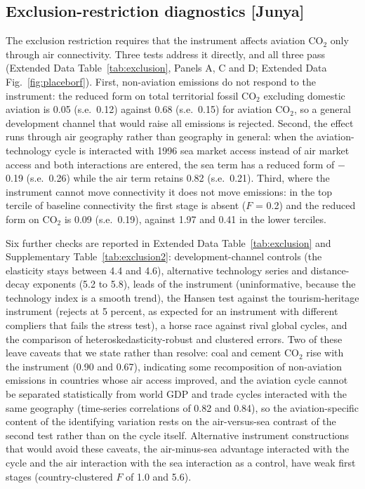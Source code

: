 \documentclass[12pt]{extarticle}
\begin{document}
\subsection*{Exclusion-restriction diagnostics [Junya]}
The exclusion restriction requires that the instrument affects aviation
CO$_2$ only through air connectivity. Three tests address it directly, and
all three pass (Extended Data Table~\ref{tab:exclusion}, Panels A, C and D;
Extended Data Fig.~\ref{fig:placeborf}). First, non-aviation emissions do
not respond to the instrument: the reduced form on total territorial fossil
CO$_2$ excluding domestic aviation is 0.05 (s.e.\ 0.12) against 0.68 (s.e.\
0.15) for aviation CO$_2$, so a general development channel that would
raise all emissions is rejected. Second, the effect runs through air
geography rather than geography in general: when the aviation-technology
cycle is interacted with 1996 sea market access instead of air market
access and both interactions are entered, the sea term has a reduced form
of $-$0.19 (s.e.\ 0.26) while the air term retains 0.82 (s.e.\ 0.21). Third,
where the instrument cannot move connectivity it does not move emissions:
in the top tercile of baseline connectivity the first stage is absent
($F$ = 0.2) and the reduced form on CO$_2$ is 0.09 (s.e.\ 0.19), against
1.97 and 0.41 in the lower terciles.

Six further checks are reported in Extended Data Table~\ref{tab:exclusion}
and Supplementary Table~\ref{tab:exclusion2}: development-channel controls
(the elasticity stays between 4.4 and 4.6), alternative technology series
and distance-decay exponents (5.2 to 5.8), leads of the instrument
(uninformative, because the technology index is a smooth trend), the
Hansen test against the tourism-heritage instrument (rejects at 5 percent,
as expected for an instrument with different compliers that fails the
stress test), a horse race against rival global cycles, and the comparison
of heteroskedasticity-robust and clustered errors. Two of these leave
caveats that we state rather than resolve: coal and cement CO$_2$ rise
with the instrument (0.90 and 0.67), indicating some recomposition of
non-aviation emissions in countries whose air access improved, and the
aviation cycle cannot be separated statistically from world GDP and trade
cycles interacted with the same geography (time-series correlations of
0.82 and 0.84), so the aviation-specific content of the identifying
variation rests on the air-versus-sea contrast of the second test rather
than on the cycle itself. Alternative instrument constructions that would
avoid these caveats, the air-minus-sea advantage interacted with the
cycle and the air interaction with the sea interaction as a control, have
weak first stages (country-clustered $F$ of 1.0 and 5.6).
\end{document}
